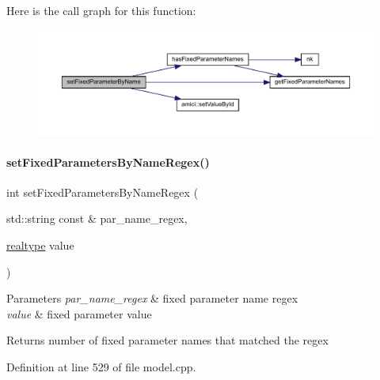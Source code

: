 Here is the call graph for this function\+:
\nopagebreak
\begin{figure}[H]
\begin{center}
\leavevmode
\includegraphics[width=350pt]{classamici_1_1_model_af1225439bd6deceb98b224e75a960800_cgraph}
\end{center}
\end{figure}
\mbox{\label{classamici_1_1_model_a4802f7d56264e3b592c167da8166cb73}} 
\paragraph{\texorpdfstring{set\+Fixed\+Parameters\+By\+Name\+Regex()}{setFixedParametersByNameRegex()}}
{\footnotesize\ttfamily int set\+Fixed\+Parameters\+By\+Name\+Regex (\begin{DoxyParamCaption}\item[{std\+::string const \&}]{par\+\_\+name\+\_\+regex,  }\item[{\mbox{\hyperlink{namespaceamici_a1bdce28051d6a53868f7ccbf5f2c14a3}{realtype}}}]{value }\end{DoxyParamCaption})}


\begin{DoxyParams}{Parameters}
{\em par\+\_\+name\+\_\+regex} & fixed parameter name regex \\
\hline
{\em value} & fixed parameter value \\
\hline
\end{DoxyParams}
\begin{DoxyReturn}{Returns}
number of fixed parameter names that matched the regex 
\end{DoxyReturn}


Definition at line 529 of file model.\+cpp.

